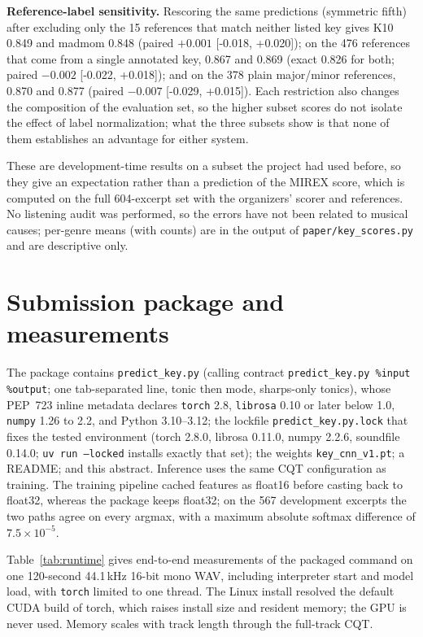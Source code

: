 \documentclass{article}
\newcommand{\ci}[2]{{\footnotesize[#1, #2]}}
\begin{document}
\textbf{Reference-label sensitivity.} Rescoring the same predictions (symmetric
fifth) after excluding only the 15 references that match neither listed key gives K10
0.849 and madmom 0.848 (paired $+0.001$ \ci{-0.018}{+0.020}); on the 476 references
that come from a single annotated key, 0.867 and 0.869 (exact 0.826 for both; paired
$-0.002$ \ci{-0.022}{+0.018}); and on the 378 plain major/minor references, 0.870 and
0.877 (paired $-0.007$ \ci{-0.029}{+0.015}). Each restriction also changes the
composition of the evaluation set, so the higher subset scores do not isolate the
effect of label normalization; what the three subsets show is that none of them
establishes an advantage for either system.

These are development-time results on a subset the project had used before, so they
give an expectation rather than a prediction of the MIREX score, which is computed on
the full 604-excerpt set with the organizers' scorer and references. No listening audit was performed, so the errors have not been related to
musical causes; per-genre means (with counts) are in the output of
\texttt{paper/key\_scores.py} and are descriptive only.

\section{Submission package and measurements}
\label{sec:package}

The package contains \texttt{predict\_key.py} (calling contract
\texttt{predict\_key.py \%input \%output}; one tab-separated line, tonic then mode,
sharps-only tonics), whose PEP~723 inline metadata declares \texttt{torch} 2.8,
\texttt{librosa} 0.10 or later below 1.0, \texttt{numpy} 1.26 to 2.2, and Python
3.10--3.12; the lockfile \texttt{predict\_key.py.lock} that fixes the tested
environment (torch 2.8.0, librosa 0.11.0, numpy 2.2.6, soundfile 0.14.0;
\texttt{uv run --locked} installs exactly that set); the weights
\texttt{key\_cnn\_v1.pt}; a README; and this abstract. Inference uses the same CQT configuration as training. The
training pipeline cached features as float16 before casting back to float32, whereas
the package keeps float32; on the 567 development excerpts the two paths agree on every
argmax, with a maximum absolute softmax difference of $7.5\times10^{-5}$.

Table~\ref{tab:runtime} gives end-to-end measurements of the packaged command on one
120-second 44.1\,kHz 16-bit mono WAV, including interpreter start and model load, with
\texttt{torch} limited to one thread. The Linux install resolved the default CUDA build
of torch, which raises install size and resident memory; the GPU is never used. Memory
scales with track length through the full-track CQT.
\end{document}
